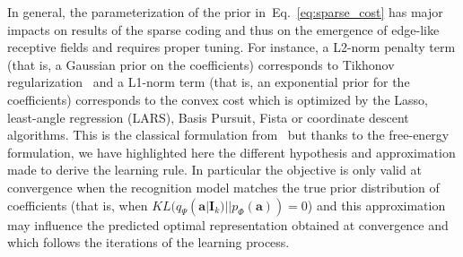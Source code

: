 \documentclass[draft]{article} %
\newcommand{\coef}{\mathbf{a}} %
\newcommand{\image}{\mathbf{I}} %
\newcommand{\dico}{\Phi} %
\newcommand{\seeEq}[1]{Eq.~\ref{eq:#1}}%
\begin{document}
In general, the parameterization of the prior in~\seeEq{sparse_cost} has major impacts on results of the sparse coding and thus on the emergence of edge-like receptive fields and requires proper tuning. For instance, a L2-norm penalty term (that is, a Gaussian prior on the coefficients) corresponds to Tikhonov regularization~\citep{Tikhonov77} and a L1-norm term (that is, an exponential prior for the coefficients) corresponds to the convex cost which is optimized by the Lasso, least-angle regression (LARS), Basis Pursuit, Fista or coordinate descent algorithms. %
This is the classical formulation from~\citet{Olshausen97} but thanks to the free-energy formulation,  we have highlighted here the different hypothesis and approximation made to derive the learning rule. In particular the objective is only valid at convergence when the recognition model matches the true prior distribution of coefficients (that is, when $KL( q_\Psi(\coef | \image_k) || p_\dico(\coef) )=0$) and this approximation may influence the predicted optimal representation obtained at convergence and which follows the iterations of the learning process.%
\end{document}
